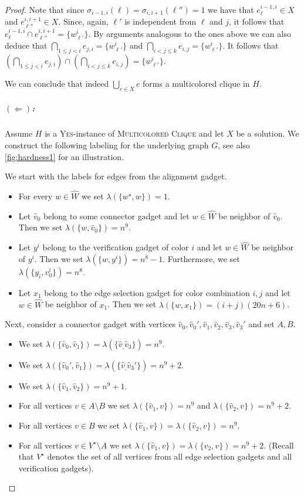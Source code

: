 \documentclass[a4paper,UKenglish,cleveref, autoref, thm-restate]{lipics-v2021}
\begin{document}
\begin{proof}
Note that since $\sigma_{i-1,i}(\ell)=\sigma_{i,i+1}(\ell'')=1$ we have that $e^{i-1,i}_\ell\in X$ and $e^{i,i+1}_{\ell''}\in X$.
Since, again, $\ell'$ is independent from $\ell$ and $j$, it follows that $e^{i-1,i}_\ell\cap e^{i,i+1}_{\ell''} =\{w^i_{\ell'}\}$. By arguments analogous to the ones above we can also deduce that $\bigcap_{1\le j<i} e_{j,i}=\{w^i_{\ell'}\}$ and $\bigcap_{i<j\le k} e_{i,j}=\{w^i_{\ell'}\}$. It follows that $(\bigcap_{1\le j<i} e_{j,i}) \cap (\bigcap_{i<j\le k} e_{i,j})=\{w^i_{\ell'}\}$.

We can conclude that indeed $\bigcup_{e\in X}e$ forms a multicolored clique in $H$.

\subparagraph{$(\Leftarrow)$:} Assume $H$ is a \textsc{Yes}-instance of \textsc{Multicolored Clique} and let $X$ be a solution. We construct the following labeling for the underlying graph $G$, see also \cref{fig:hardness1} for an illustration.

We start with the labels for edges from the alignment gadget. 
\begin{itemize}
    \item For every $w\in\hat{W}$ we set $\lambda(\{w^\star,w\})=1$.
    \item Let $\hat{v}_0$ belong to some connector gadget and let $w\in\hat{W}$ be neighbor of $\hat{v}_0$. Then we set $\lambda(\{w,\hat{v}_0\})=n^9$.
    \item Let $y^i$ belong to the verification gadget of color $i$ and let $w\in\hat{W}$ be neighbor of $y^i$. Then we set $\lambda(\{w,y^i\})=n^8-1$. Furthermore, we set $\lambda(\{y_i,v^i_0\})=n^8$.
    \item Let $x_1$ belong to the edge selection gadget for color combination $i,j$ and let $w\in\hat{W}$ be neighbor of $x_1$. Then we set $\lambda(\{w,x_1\})=(i+j)(20n+6)$.
\end{itemize}

Next, consider a connector gadget with vertices $\hat{v}_0,\hat{v}_0',\hat{v}_1,\hat{v}_2,\hat{v}_3,\hat{v}_3'$ and set $A,B$.
\begin{itemize}
    \item We set $\lambda(\{\hat{v}_0,\hat{v}_1\})=\lambda(\{\hat{v}_,\hat{v}_3\})=n^9$.
    \item We set $\lambda(\{\hat{v}_0',\hat{v}_1\})=\lambda(\{\hat{v}_,\hat{v}_3'\})=n^9+2$.
    \item We set $\lambda(\{\hat{v}_1,\hat{v}_2\})=n^9+1$.
    \item For all vertices $v\in A\setminus B$ we set $\lambda(\{\hat{v}_1,v\})=n^9$ and $\lambda(\{\hat{v}_2,v\})=n^9+2$.
    \item For all vertices $v\in B$ we set $\lambda(\{\hat{v}_1,v\})=\lambda(\{\hat{v}_2,v\})=n^9$.
    \item For all vertices $v\in V^\star\setminus A$ we set $\lambda(\{\hat{v}_1,v\})=\lambda(\{\hat{v}_2,v\})=n^9+2$. (Recall that $V^\star$ denotes the set of all vertices from all edge selection gadgets and all verification gadgets).
\end{itemize}



\end{proof}
\end{document}
